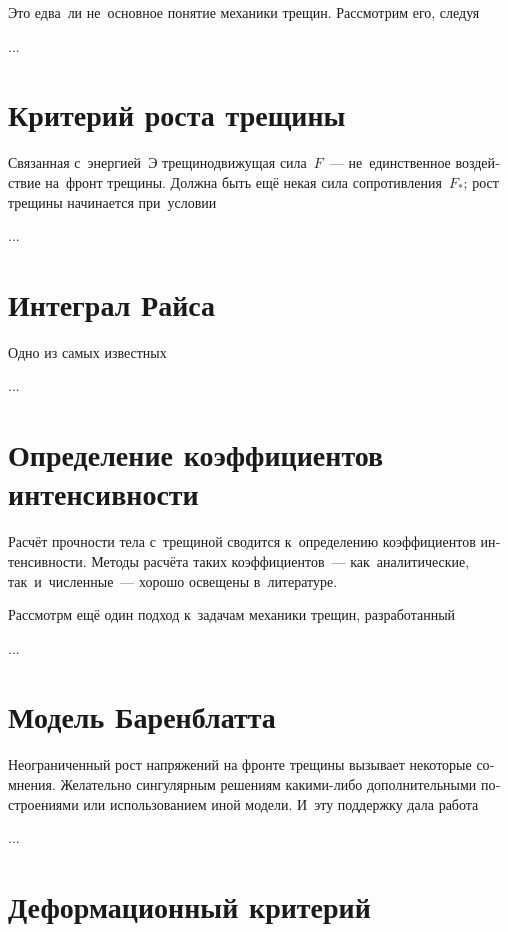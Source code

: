 \begin{otherlanguage}{russian}
Это едва~ли не~основное понятие механики трещин. Рассмотрим его, следуя

...



\section{Критерий роста трещины}

Связанная с~энергией~$\textit{Э}$ трещинодвижущая сила~$F$~--- не~единственное воздействие на~фронт трещины. Должна быть ещё некая сила сопротивления~$F_{*}$; рост трещины начинается при~условии

...



\section{Интеграл Райса}

Одно из самых известных

...



\section{Определение коэффициентов интенсивности}

Расчёт прочности тела с~трещиной сводится к~определению коэффициентов интенсивности. Методы расчёта таких коэффициентов~--- как~аналитические, так~и~численные~--- хорошо освещены в~литературе.

Рассмотрм ещё один подход к~задачам механики трещин, разработанный

...



\section{Модель Баренблатта}

Неограниченный рост напряжений на фронте трещины вызывает некоторые сомнения. Желательно  сингулярным решениям какими\hbox{-}либо дополнительными построениями или использованием иной модели. И~эту поддержку дала работа

...



\section{Деформационный критерий}


\end{otherlanguage}
